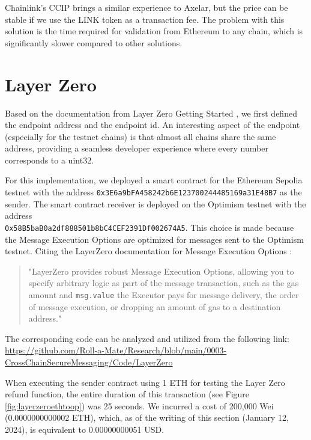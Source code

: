 \documentclass[fleqn,10pt]{olplainarticle}
\begin{document}
Chainlink's CCIP brings a similar experience to Axelar, but the price can be stable if we use the LINK token as a transaction fee. The problem with this solution is the time required for validation from Ethereum to any chain, which is significantly slower compared to other solutions.


\section{Layer Zero}

Based on the documentation from Layer Zero Getting Started \cite{layer_zero_Getting}, we first defined the endpoint address and the endpoint id. An interesting aspect of the endpoint (especially for the testnet chains) is that almost all chains share the same address, providing a seamless developer experience where every number corresponds to a uint32.

For this implementation, we deployed a smart contract for the Ethereum Sepolia testnet with the address \texttt{0x3E6a9bFA458242b6E123700244485169a31E48B7} as the sender. The smart contract receiver is deployed on the Optimism testnet with the address \\ \texttt{0x58B5baB0a2df888501b8bC4CEF2391Df002674A5}. This choice is made because the Message Execution Options are optimized for messages sent to the Optimism testnet. Citing the LayerZero documentation for Message Execution Options \cite{layer_zero_options}:

\begin{quote}
	"LayerZero provides robust Message Execution Options, allowing you to specify arbitrary logic as part of the message transaction, such as the gas amount and \texttt{msg.value} the Executor pays for message delivery, the order of message execution, or dropping an amount of gas to a destination address."
\end{quote}

The corresponding code can be analyzed and utilized from the following link:
\url{https://github.com/Roll-a-Mate/Research/blob/main/0003-CrossChainSecureMessaging/Code/LayerZero}

When executing the sender contract using 1 ETH for testing the Layer Zero refund function, the entire duration of this transaction (see Figure \ref{fig:layerzeroethtoop}) was 25 seconds. We incurred a cost of 200,000 Wei (0.0000000000002 ETH), which, as of the writing of this section (January 12, 2024), is equivalent to 0.00000000051 USD.
\end{document}
